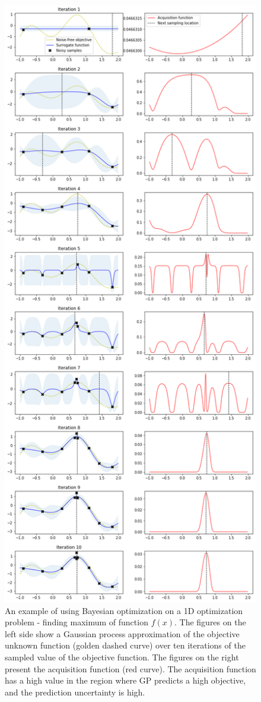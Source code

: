 \begin{figure}[!ht]
\centering
\vspace*{-2cm}
\includegraphics[scale=0.55]{figures/BO.png}
\caption{An example of using Bayesian optimization on a 1D optimization problem - finding maximum of function $f(x)$. 
The figures on the left side show a Gaussian process approximation of the objective unknown function (golden dashed curve) over ten iterations of the sampled value of the objective function. The figures on the right present the acquisition function (red curve). The acquisition function has a high value in the region where GP predicts a high objective, and the prediction uncertainty is high. 
\label{fig:BO}}
\end{figure}




